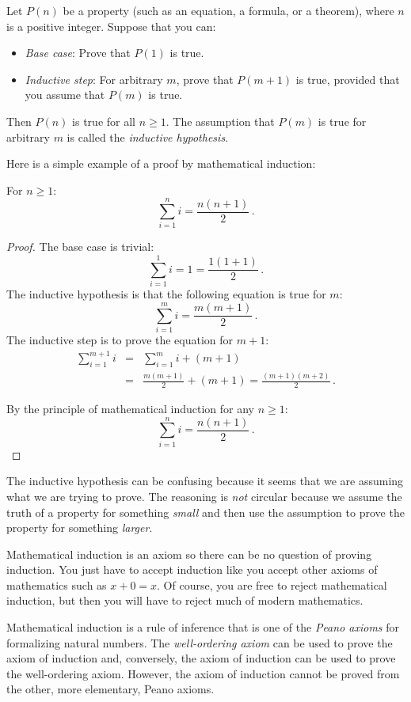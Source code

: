 \begin{axiom}
Let $P(n)$ be a property (such as an equation, a formula, or a theorem), where $n$ is a positive integer. Suppose that you can:
\begin{itemize}
\item \emph{Base case}: Prove that $P(1)$ is true.
\item \emph{Inductive step}: For arbitrary $m$, prove that $P(m+1)$ is true, provided that you assume that $P(m)$ is true.
\end{itemize}
Then $P(n)$ is true for all $n\geq 1$.
The assumption that $P(m)$ is true for arbitrary $m$ is called the \emph{inductive hypothesis}.
\end{axiom}
Here is a simple example of a proof by mathematical induction:
\begin{theorem}\label{t.sum}
For $n\geq 1$:
\[
\sum_{i=1}^n i = \frac{n(n+1)}{2}\,.
\]
\end{theorem}

\begin{proof} The base case is trivial:
\[
\sum_{i=1}^1 i = 1 =\frac{1(1+1)}{2}\,.
\]
The inductive hypothesis is that the following equation is true for $m$:
\[
\sum_{i=1}^{m} i = \frac{m(m+1)}{2}\,.
\]
The inductive step is to prove the equation for $m+1$:
\begin{eqnarray*}
\sum_{i=1}^{m+1} i &=& \sum_{i=1}^m i + (m+1)\label{l.sum1}\\
&=&\frac{m(m+1)}{2} + (m+1)\label{l.sum2}
=\frac{(m+1)(m+2)}{2}\,.\label{l.sum4}
\end{eqnarray*}

By the principle of mathematical induction for any $n\geq 1$:
\[
\sum_{i=1}^n i = \frac{n(n+1)}{2}\,.
\]
\end{proof}

The inductive hypothesis can be confusing because it seems that we are assuming what we are trying to prove. The reasoning is \emph{not} circular because we assume the truth of a property for something \emph{small} and then use the assumption to prove the property for something \emph{larger}.

Mathematical induction is an axiom so there can be no question of proving induction. You just have to accept induction like you accept other axioms of mathematics such as $x+0=x$. Of course, you are free to reject mathematical induction, but then you will have to reject much of modern mathematics.
\begin{advanced}
Mathematical induction is a rule of inference that is one of the \emph{Peano axioms} for formalizing natural numbers. The \emph{well-ordering axiom} can be used to prove the axiom of induction and, conversely, the axiom of induction can be used to prove the well-ordering axiom. However, the axiom of induction cannot be proved from the other, more elementary, Peano axioms.
\end{advanced}

